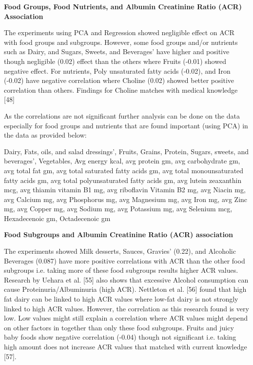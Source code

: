 \noindent \textbf{Food Groups, Food Nutrients, and Albumin Creatinine Ratio (ACR) Association}

\noindent The experiments using PCA and Regression showed negligible effect on ACR with food groups and subgroups. However, some food groups and/or nutrients such as Dairy, and  Sugars, Sweets, and Beverages’  have higher and positive though negligible (0.02) effect than the others where Fruits (-0.01) showed negative effect.  For nutrients, Poly unsaturated fatty acids (-0.02), and Iron (-0.02) have negative correlation where Choline (0.02) showed better positive correlation than others. Findings for Choline matches with medical knowledge [48]

 \noindent As the correlations are not significant further analysis can be done on the data especially for food groups and nutrients that are found important (using PCA) in the data as provided below:

\noindent Dairy,  Fats, oils, and salad dressings’,  Fruits,  Grains,  Protein,   Sugars, sweets, and beverages’, Vegetables, Avg energy kcal,  avg protein gm,  avg carbohydrate gm,  avg total fat gm,  avg total saturated fatty acids gm, avg total monounsaturated fatty acids gm,  avg total polyunsaturated fatty acids gm, avg lutein zeaxanthin mcg,  avg thiamin vitamin B1 mg,  avg riboflavin Vitamin B2 mg,  avg Niacin mg, avg Calcium mg,  avg Phosphorus mg,  avg Magnesium mg,  avg Iron mg, avg Zinc mg,  avg Copper mg,  avg Sodium mg,  avg Potassium mg,  avg Selenium mcg,  Hexadecenoic gm,  Octadecenoic gm

\noindent \textbf{Food Subgroups and Albumin Creatinine Ratio (ACR) association}

\noindent The experiments showed  Milk desserts, Sauces, Gravies’ (0.22), and Alcoholic Beverages (0.087) have more positive correlations with ACR than the other food subgroups  i.e. taking more of these food subgroups results higher ACR values. Research by Uehara et al. [55] also shows that excessive Alcohol consumption can cause Proteinuria/Albuminuria (high ACR). Nettleton et al. [56] found that high fat dairy can be linked to high ACR values where low-fat dairy is not strongly linked to high ACR values. However, the correlation as this research found is very low. Low values might still explain a correlation where ACR values might depend on other factors in together than only these food subgroups. Fruits and juicy baby foods show negative correlation (-0.04) though not significant i.e. taking high amount does not increase ACR values that matched with current knowledge [57].